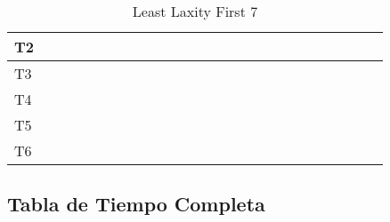 \documentclass[xcolor=table]{beamer}
\begin{document}
\begin{frame}
\begin{table}
{\begin{tabular}{|l|l|l|l|l|l|l|l|l|l|l|l|l|l|l|l|l|l|l|l|l|l|l|l|l|}
T2 & & \cellcolor{purple} & & \cellcolor{purple} & & \cellcolor{purple} & & \cellcolor{purple} & & \cellcolor{purple} & & \cellcolor{purple} & & \cellcolor{purple} & & \cellcolor{purple} & & \cellcolor{purple} & & \cellcolor{purple} & & \cellcolor{purple} & & \cellcolor{purple} \\ \hline 
T3 & \cellcolor{cyan} & & \cellcolor{cyan} & & \cellcolor{cyan} & & \cellcolor{cyan} & & \cellcolor{cyan} & & \cellcolor{cyan} & & \cellcolor{cyan} & & \cellcolor{cyan} & & \cellcolor{cyan} & & \cellcolor{cyan} & & \cellcolor{cyan} & & \cellcolor{cyan} & \\ \hline 
T4 & & & & & & & & & & & & & & & & & & & & & & & & \\ \hline 
T5 & & & & & & & & & & & & & & & & & & & & & & & & \\ \hline 
T6 & & & & & & & & & & & & & & & & & & & & & & & & \\ \hline 
\end{tabular} 
} 
\caption{ Least Laxity First 7 } 
\end{table} 
\end{frame} 

\subsection{Tabla de Tiempo Completa} 
\end{document}
